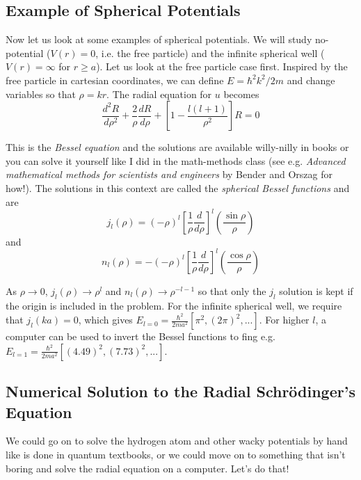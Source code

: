 \documentclass[prb,aps,11pt,superscriptaddress,floatfix]{revtex4-2}
\begin{document}
\subsection{Example of Spherical Potentials}

Now let us look at some examples of spherical potentials. We will study no-potential ($V(r)=0$, i.e. the free particle) and the infinite spherical well ($V(r)=\infty$ for $r \geq a$). Let us look at the free particle case first. Inspired by the free particle in cartesian coordinates, we can define $E=\hbar^2 k^2/2m$ and change variables so that $\rho=kr$. The radial equation for $u$ becomes 
\begin{equation}
  \frac{d^2R}{d\rho^2} + \frac{2}{\rho}\frac{dR}{d\rho}+\left[1-\frac{l(l+1)}{\rho^2}\right] R=0
  \label{eq:free_particle_spherical}
\end{equation}

This is the \emph{Bessel equation} and the solutions are available willy-nilly in books or you can solve it yourself like I did in the math-methods class (see e.g. \emph{Advanced mathematical methods for scientists and engineers} by Bender and Orszag for how!). The solutions in this context are called the \emph{spherical Bessel functions} and are 
\begin{equation}
  j_l(\rho)=(-\rho)^l\left[\frac{1}{\rho} \frac{d}{d\rho} \right]^l \left(\frac{\sin \rho}{\rho} \right)
\end{equation}
and 
\begin{equation}
  n_l(\rho)=-(-\rho)^l\left[\frac{1}{\rho} \frac{d}{d\rho} \right]^l \left(\frac{\cos \rho}{\rho} \right)
\end{equation}

As $\rho \rightarrow 0$, $j_l(\rho)\rightarrow \rho^l$ and $n_l(\rho)\rightarrow \rho^{-l-1}$ so that only the $j_l$ solution is kept if the origin is included in the problem. For the infinite spherical well, we require that $j_l(ka)=0$, which gives $E_{l=0}= \frac{\hbar^2}{2ma^2}\left[\pi^2,(2\pi)^2,...\right]$. For higher $l$, a computer can be used to invert the Bessel functions to fing e.g. $E_{l=1}= \frac{\hbar^2}{2ma^2}\left[(4.49)^2,(7.73)^2,...\right]$.


\subsection{Numerical Solution to the Radial Schr\"odinger's Equation}

We could go on to solve the hydrogen atom and other wacky potentials by hand like is done in quantum textbooks, or we could move on to something that isn't boring and solve the radial equation on a computer. Let's do that!
\end{document}

